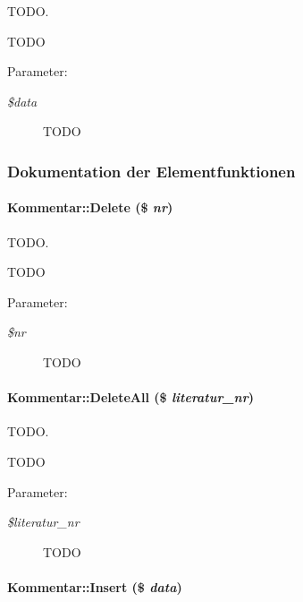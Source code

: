 TODO. 

TODO \begin{Desc}
\item[Parameter:]
\begin{description}
\item[{\em \$data}]TODO \end{description}
\end{Desc}


\subsubsection{Dokumentation der Elementfunktionen}
\hypertarget{classKommentar_31c1fdfb4fb8f24e0016c8ddb98ddcdc}{
\paragraph[Delete]{\setlength{\rightskip}{0pt plus 5cm}Kommentar::Delete (\$ {\em nr})}\hfill}
\label{classKommentar_31c1fdfb4fb8f24e0016c8ddb98ddcdc}


TODO. 

TODO \begin{Desc}
\item[Parameter:]
\begin{description}
\item[{\em \$nr}]TODO \end{description}
\end{Desc}
\hypertarget{classKommentar_9903f1df98f71eefa3b44a81d6a8ee5c}{
\paragraph[DeleteAll]{\setlength{\rightskip}{0pt plus 5cm}Kommentar::Delete\-All (\$ {\em literatur\_\-nr})}\hfill}
\label{classKommentar_9903f1df98f71eefa3b44a81d6a8ee5c}


TODO. 

TODO \begin{Desc}
\item[Parameter:]
\begin{description}
\item[{\em \$literatur\_\-nr}]TODO \end{description}
\end{Desc}
\hypertarget{classKommentar_2cafefbbb7bddd9bc63ebe37bebcac1d}{
\paragraph[Insert]{\setlength{\rightskip}{0pt plus 5cm}Kommentar::Insert (\$ {\em data})}\hfill}
\label{classKommentar_2cafefbbb7bddd9bc63ebe37bebcac1d}


